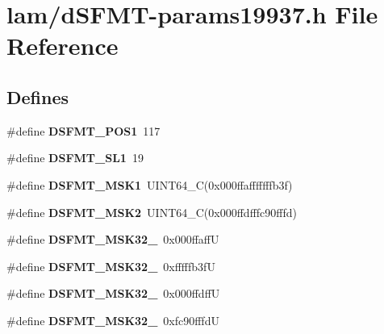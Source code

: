 \hypertarget{dSFMT-params19937_8h}{
\section{lam/dSFMT-\/params19937.h File Reference}
\label{dSFMT-params19937_8h}
}
\subsection*{Defines}
\begin{DoxyCompactItemize}
\item 
\hypertarget{dSFMT-params19937_8h_ad9d18b8b826f0eef5b6cd0ad476a4030}{
\#define {\bfseries DSFMT\_\-POS1}~117}
\label{dSFMT-params19937_8h_ad9d18b8b826f0eef5b6cd0ad476a4030}

\item 
\hypertarget{dSFMT-params19937_8h_a1115ed89aa28956065010f4803f41c68}{
\#define {\bfseries DSFMT\_\-SL1}~19}
\label{dSFMT-params19937_8h_a1115ed89aa28956065010f4803f41c68}

\item 
\hypertarget{dSFMT-params19937_8h_a2f09944ea28b7d7ae08968a5f9fd9479}{
\#define {\bfseries DSFMT\_\-MSK1}~UINT64\_\-C(0x000ffafffffffb3f)}
\label{dSFMT-params19937_8h_a2f09944ea28b7d7ae08968a5f9fd9479}

\item 
\hypertarget{dSFMT-params19937_8h_a0a56ac7e98b65d18b2d71fec621d0312}{
\#define {\bfseries DSFMT\_\-MSK2}~UINT64\_\-C(0x000ffdfffc90fffd)}
\label{dSFMT-params19937_8h_a0a56ac7e98b65d18b2d71fec621d0312}

\item 
\hypertarget{dSFMT-params19937_8h_adcf0d2c08bb2b64521b33b25b673ca12}{
\#define {\bfseries DSFMT\_\-MSK32\_}~0x000ffaffU}
\label{dSFMT-params19937_8h_adcf0d2c08bb2b64521b33b25b673ca12}

\item 
\hypertarget{dSFMT-params19937_8h_a78da5a23f4a57d7ff08e27a219fbba66}{
\#define {\bfseries DSFMT\_\-MSK32\_}~0xfffffb3fU}
\label{dSFMT-params19937_8h_a78da5a23f4a57d7ff08e27a219fbba66}

\item 
\hypertarget{dSFMT-params19937_8h_aea216b8c899925e0b6ee2fb0b2e63649}{
\#define {\bfseries DSFMT\_\-MSK32\_}~0x000ffdffU}
\label{dSFMT-params19937_8h_aea216b8c899925e0b6ee2fb0b2e63649}

\item 
\hypertarget{dSFMT-params19937_8h_a5b7690571e7c4fa0d62e27cb4126c20c}{
\#define {\bfseries DSFMT\_\-MSK32\_}~0xfc90fffdU}
\label{dSFMT-params19937_8h_a5b7690571e7c4fa0d62e27cb4126c20c}


\end{DoxyCompactItemize}
